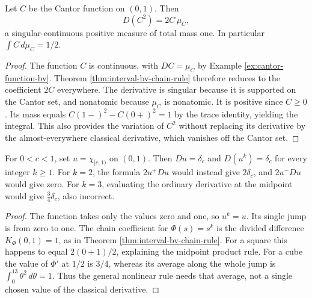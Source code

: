 \begin{example}\label{ex:cantor-square-derivative}
Let $C$ be the Cantor function on $(0,1)$. Then
\[
 D(C^2)=2C\,\mu_C,
\]
a singular-continuous positive measure of total mass one. In particular $\int C\,d\mu_C=1/2$.
\end{example}
\begin{proof}
The function $C$ is continuous, with $DC=\mu_C$ by Example \ref{ex:cantor-function-bv}. Theorem \ref{thm:interval-bv-chain-rule} therefore reduces to the coefficient $2C$ everywhere. The derivative is singular because it is supported on the Cantor set, and nonatomic because $\mu_C$ is nonatomic. It is positive since $C\geq0$. Its mass equals $C(1-)^2-C(0+)^2=1$ by the trace identity, yielding the integral. This also provides the variation of $C^2$ without replacing its derivative by the almost-everywhere classical derivative, which vanishes off the Cantor set.
\end{proof}

\begin{example}\label{ex:nonlinear-bv-jump-coefficient}
For $0<c<1$, set $u=\chi_{[c,1)}$ on $(0,1)$. Then $Du=\delta_c$ and $D(u^k)=\delta_c$ for every integer $k\geq1$. For $k=2$, the formula $2u^+Du$ would instead give $2\delta_c$, and $2u^-Du$ would give zero. For $k=3$, evaluating the ordinary derivative at the midpoint would give $\tfrac34\delta_c$, also incorrect.
\end{example}
\begin{proof}
The function takes only the values zero and one, so $u^k=u$. Its single jump is from zero to one. The chain coefficient for $\Phi(s)=s^k$ is the divided difference $K_\Phi(0,1)=1$, as in Theorem \ref{thm:interval-bv-chain-rule}. For a square this happens to equal $2(0+1)/2$, explaining the midpoint product rule. For a cube the value of $\Phi'$ at $1/2$ is $3/4$, whereas its average along the whole jump is $\int_0^13\theta^2\,d\theta=1$. Thus the general nonlinear rule needs that average, not a single chosen value of the classical derivative.
\end{proof}
